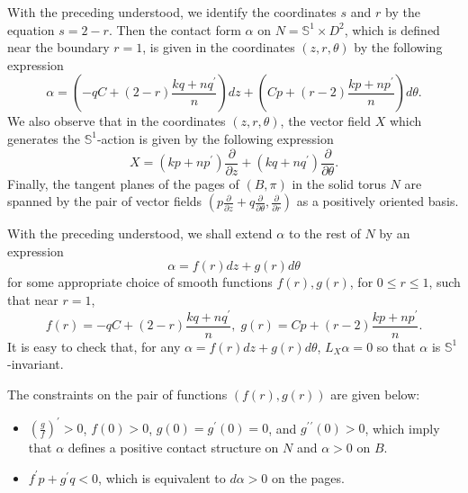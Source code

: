 \documentclass[11pt]{amsart}
\theoremstyle{plain}
\numberwithin{theorem}{section}
\theoremstyle{definition}
\newcommand{\s}{{\mathbb S}}
\begin{document}
With the preceding understood, we identify the coordinates $s$ and $r$ by the equation $s=2-r$.
Then the contact form $\alpha$ on $N=\s^1\times D^2$, which is defined near the boundary $r=1$,
is given in the coordinates $(z,r,\theta)$ by the following expression
$$
\alpha=(-qC+(2-r)\frac{kq+nq^\prime}{n})dz+(Cp+(r-2)\frac{kp+np^\prime}{n})d\theta.
$$
We also observe that in the coordinates $(z,r,\theta)$, the vector field $X$ which generates the
$\s^1$-action is given by the following expression
$$
X=(kp+np^\prime)\frac{\partial}{\partial z}+(kq+nq^\prime)\frac{\partial}{\partial \theta}.
$$
Finally, the tangent planes of the pages of $(B,\pi)$ in the solid torus $N$ are
spanned by the pair of vector fields $(p\frac{\partial}{\partial z}+q\frac{\partial}{\partial \theta},
\frac{\partial}{\partial r})$ as a positively oriented basis.  

With the preceding understood, we shall extend $\alpha$ to the rest of $N$ by an expression 
$$
\alpha=f(r)dz+g(r)d\theta
$$
for some appropriate choice of smooth functions $f(r),g(r)$, for $0\leq r\leq 1$, such that near $r=1$,
$$
f(r)=-qC+(2-r)\frac{kq+nq^\prime}{n},\; g(r)=Cp+(r-2)\frac{kp+np^\prime}{n}.
$$
It is easy to check that, for any $\alpha=f(r)dz+g(r)d\theta$, $L_X\alpha=0$ so that $\alpha$ is 
$\s^1$-invariant. 

The constraints on the pair of functions $(f(r),g(r))$ are given below:
\begin{itemize}
\item[{(i)}] $(\frac{g}{f})^\prime>0$, $f(0)>0$, $g(0)=g^\prime(0)=0$, and $g^\prime{^\prime}(0)>0$, which imply that $\alpha$ defines a positive contact structure on $N$ and $\alpha>0$ on $B$.
\item[{(ii)}] $f^\prime p+g^\prime q<0$, which is equivalent to $d\alpha>0$ on the pages. 
\end{itemize}
\end{document}
